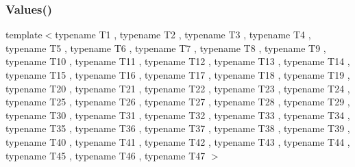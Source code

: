 \mbox{\label{namespacetesting_aba2697b2cd3e9d667ab3807022303240}} 
\subsubsection{\texorpdfstring{Values()}{Values()}\hspace{0.1cm}{\footnotesize\ttfamily [47/50]}}
{\footnotesize\ttfamily template$<$typename T1 , typename T2 , typename T3 , typename T4 , typename T5 , typename T6 , typename T7 , typename T8 , typename T9 , typename T10 , typename T11 , typename T12 , typename T13 , typename T14 , typename T15 , typename T16 , typename T17 , typename T18 , typename T19 , typename T20 , typename T21 , typename T22 , typename T23 , typename T24 , typename T25 , typename T26 , typename T27 , typename T28 , typename T29 , typename T30 , typename T31 , typename T32 , typename T33 , typename T34 , typename T35 , typename T36 , typename T37 , typename T38 , typename T39 , typename T40 , typename T41 , typename T42 , typename T43 , typename T44 , typename T45 , typename T46 , typename T47 $>$ \\
}
